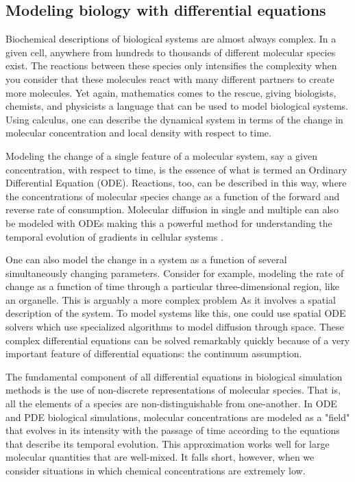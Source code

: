 \documentclass[12pt]{ucsddissertation}
\begin{document}
\begin{dissertationintroduction}
\subsection{Modeling biology with differential equations}
Biochemical descriptions of biological systems are almost always complex. In a given cell, anywhere from hundreds to thousands of different molecular species exist. The reactions between these species only intensifies the complexity when you consider that these molecules react with many different partners to create more molecules. Yet again, mathematics comes to the rescue, giving biologists, chemists, and physicists a language that can be used to model biological systems. Using calculus, one can describe the dynamical system in terms of the change in molecular concentration and local density with respect to time. 

Modeling the change of a single feature of a molecular system, say a given concentration, with respect to time, is the essence of what is termed an Ordinary Differential Equation (ODE). Reactions, too, can be described in this way, where the concentrations of molecular species change as a function of the forward and reverse rate of consumption. Molecular diffusion in single and multiple can also be modeled with ODEs making this a powerful method for understanding the temporal evolution of gradients in cellular systems \cite{Faeder2009}.

One can also model the change in a system as a function of several simultaneously changing parameters. Consider for example, modeling the rate of change as a function of time through a particular three-dimensional region, like an organelle. This is arguably a more complex problem As it involves a spatial description of the system. To model systems like this, one could use spatial ODE solvers \cite{Harrison2016} which use specialized algorithms to model diffusion through space. These complex differential equations can be solved remarkably quickly because of a very important feature of differential equations: the continuum assumption.

The fundamental component of all differential equations in biological simulation methods is the use of non-discrete representations of molecular species. That is, all the elements of a species are non-distinguishable from one-another. In ODE and PDE biological simulations, molecular concentrations are modeled as a "field" that evolves in its intensity with the passage of time according to the equations that describe its temporal evolution. This approximation works well for large molecular quantities that are well-mixed. It falls short, however, when we consider situations in which chemical concentrations are extremely low.


\end{dissertationintroduction}
\end{document}
